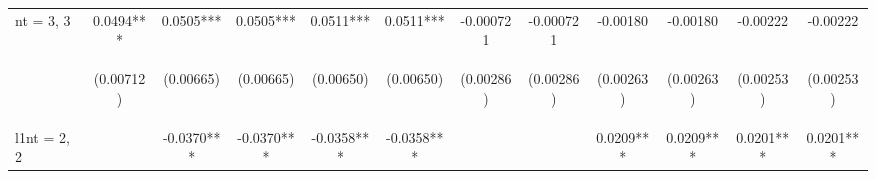 \documentclass[]{article}
\begin{document}
\begin{center}
\begin{tabular}{lccccccccccc}
nt = 3, 3 & 0.0494*** & 0.0505*** & 0.0505*** & 0.0511*** & 0.0511*** & -0.000721 & -0.000721 & -0.00180 & -0.00180 & -0.00222 & -0.00222 \\
\vspace{4pt} & \begin{footnotesize}(0.00712)\end{footnotesize} & \begin{footnotesize}(0.00665)\end{footnotesize} & \begin{footnotesize}(0.00665)\end{footnotesize} & \begin{footnotesize}(0.00650)\end{footnotesize} & \begin{footnotesize}(0.00650)\end{footnotesize} & \begin{footnotesize}(0.00286)\end{footnotesize} & \begin{footnotesize}(0.00286)\end{footnotesize} & \begin{footnotesize}(0.00263)\end{footnotesize} & \begin{footnotesize}(0.00263)\end{footnotesize} & \begin{footnotesize}(0.00253)\end{footnotesize} & \begin{footnotesize}(0.00253)\end{footnotesize} \\
l1nt = 2, 2 &  & -0.0370*** & -0.0370*** & -0.0358*** & -0.0358*** &  &  & 0.0209*** & 0.0209*** & 0.0201*** & 0.0201*** \\

\end{tabular}
\end{center}
\end{document}
